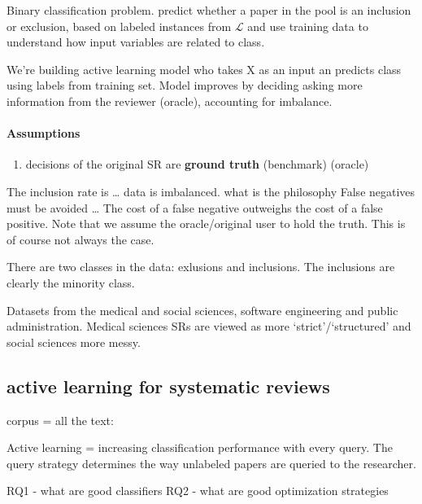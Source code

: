 \documentclass[
]{article}
\providecommand{\tightlist}{%
  \setlength{\itemsep}{0pt}\setlength{\parskip}{0pt}}
\begin{document}
Binary classification problem. predict whether a paper in the pool is an
inclusion or exclusion, based on labeled instances from \(\mathcal{L}\)
and use training data to understand how input variables are related to
class.

We're building active learning model who takes X as an input an predicts
class using labels from training set. Model improves by deciding asking
more information from the reviewer (oracle), accounting for imbalance.

\hypertarget{assumptions}{%
\paragraph{Assumptions}\label{assumptions}}

\begin{enumerate}
\def\labelenumi{\arabic{enumi})}
\tightlist
\item
  decisions of the original SR are \textbf{ground truth} (benchmark)
  (oracle)
\end{enumerate}

The inclusion rate is \ldots{} data is imbalanced. what is the
philosophy False negatives must be avoided \ldots{} The cost of a false
negative outweighs the cost of a false positive. Note that we assume the
oracle/original user to hold the truth. This is of course not always the
case.

There are two classes in the data: exlusions and inclusions. The
inclusions are clearly the minority class.

Datasets from the medical and social sciences, software engineering and
public administration. Medical sciences SRs are viewed as more
`strict'/`structured' and social sciences more messy.

\hypertarget{active-learning-for-systematic-reviews}{%
\subsection{active learning for systematic
reviews}\label{active-learning-for-systematic-reviews}}

corpus = all the text:

Active learning = increasing classification performance with every
query. The query strategy determines the way unlabeled papers are
queried to the researcher.

\autocite{modAL2018}

RQ1 - what are good classifiers RQ2 - what are good optimization
strategies
\end{document}
